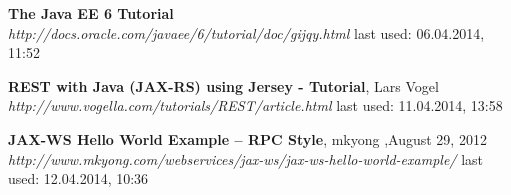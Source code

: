\documentclass[12pt]{article}
\begin{document}
\newpage
\begin{thebibliography}{56}

   \textbf{The Java EE 6 Tutorial} \\
  \textit{http://docs.oracle.com/javaee/6/tutorial/doc/gijqy.html}
  \newline last used: 06.04.2014, 11:52
  
   \textbf{REST with Java (JAX-RS) using Jersey - Tutorial}, Lars Vogel\\
  \textit{  http://www.vogella.com/tutorials/REST/article.html}
  \newline last used: 11.04.2014, 13:58
  
    
   \textbf{JAX-WS Hello World Example – RPC Style}, mkyong ,August 29, 2012\\
  \textit{  http://www.mkyong.com/webservices/jax-ws/jax-ws-hello-world-example/}
  \newline last used: 12.04.2014, 10:36
  

  
\end{thebibliography}
\end{document}
